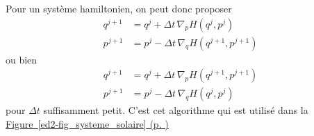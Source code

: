 Pour un système hamiltonien, on peut donc proposer \begin{align*}
q^{j+1} &= q^{j} + {\Delta t}\, \nabla_p H(q^{j},p^{j}) \\
p^{j+1} &= p^{j} - {\Delta t}\, \nabla_q H(q^{j+1},p^{j+1})
\end{align*} ou bien \begin{align*}
q^{j+1} &= q^{j} + {\Delta t}\, \nabla_p H(q^{j+1},p^{j+1}) \\
p^{j+1} &= p^{j} - {\Delta t}\, \nabla_q H(q^{j},p^j)
\end{align*} pour \({\Delta t}\) suffisamment petit. C'est cet algorithme qui est utilis\'e dans la \protect\hyperlink{ed2-fig_systeme_solaire}{Figure~\ref*{ed2-fig_systeme_solaire} (p.
\pageref*{ed2-fig_systeme_solaire})}

